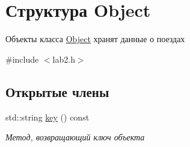 \hypertarget{structObject}{}\section{Структура Object}
\label{structObject}


Объекты класса \mbox{\hyperlink{structObject}{Object}} хранят данные о поездах  




{\ttfamily \#include $<$lab2.\+h$>$}

\subsection*{Открытые члены}
\begin{DoxyCompactItemize}
\item 
std\+::string \mbox{\hyperlink{structObject_a6c61558f8856dd361295073e79c4b73c}{key}} () const
\begin{DoxyCompactList}\small\item\em Метод, возвращающий ключ объекта \end{DoxyCompactList}\end{DoxyCompactItemize}

